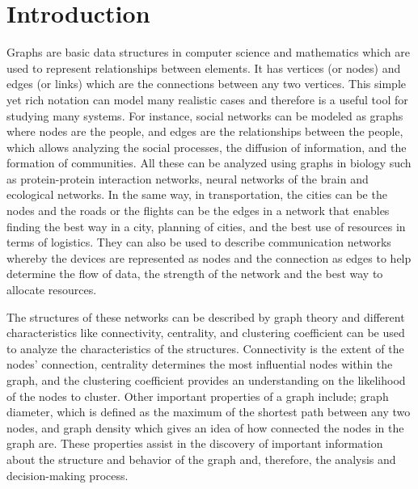 \documentclass[../Thesis.tex]{subfiles}
\begin{document}
	\section{Introduction}
	\label{sec:introduction}
	
	Graphs are basic data structures in computer science and mathematics which are used to represent relationships between elements. It has vertices (or nodes) and edges (or links) which are the connections between any two vertices. This simple yet rich notation can model many realistic cases and therefore is a useful tool for studying many systems. For instance, social networks can be modeled as graphs where nodes are the people, and edges are the relationships between the people, which allows analyzing the social processes, the diffusion of information, and the formation of communities. All these can be analyzed using graphs in biology such as protein-protein interaction networks, neural networks of the brain and ecological networks. In the same way, in transportation, the cities can be the nodes and the roads or the flights can be the edges in a network that enables finding the best way in a city, planning of cities, and the best use of resources in terms of logistics. They can also be used to describe communication networks whereby the devices are represented as nodes and the connection as edges to help determine the flow of data, the strength of the network and the best way to allocate resources.
	
	The structures of these networks can be described by graph theory and different characteristics like connectivity, centrality, and clustering coefficient can be used to analyze the characteristics of the structures. Connectivity is the extent of the nodes’ connection, centrality determines the most influential nodes within the graph, and the clustering coefficient provides an understanding on the likelihood of the nodes to cluster. Other important properties of a graph include; graph diameter, which is defined as the maximum of the shortest path between any two nodes, and graph density which gives an idea of how connected the nodes in the graph are. These properties assist in the discovery of important information about the structure and behavior of the graph and, therefore, the analysis and decision-making process.
	
\end{document}
